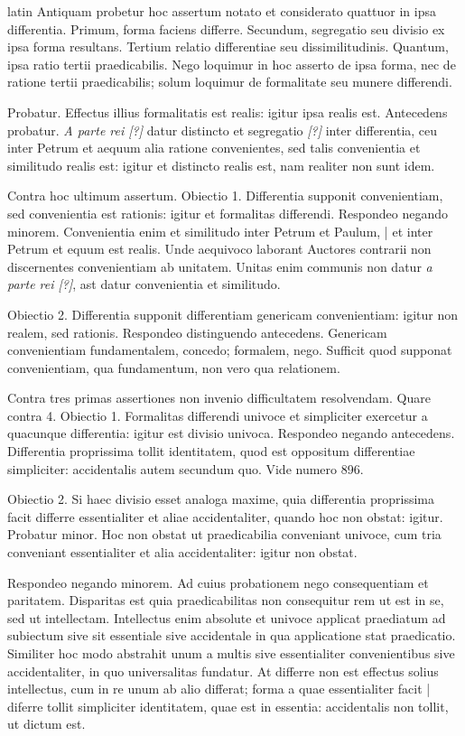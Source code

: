 \begin{otherlanguage*}{latin}
\pstart
Antiquam probetur hoc assertum notato et considerato quattuor in ipsa differentia. Primum, forma faciens differre. Secundum, segregatio seu divisio ex ipsa forma resultans. Tertium relatio differentiae seu dissimilitudinis. Quantum, ipsa ratio tertii praedicabilis. Nego loquimur in hoc asserto de ipsa forma, nec de ratione tertii praedicabilis; solum loquimur de formalitate seu munere differendi. 
\pend

\pstart
Probatur. Effectus illius formalitatis est realis:
igitur ipsa realis est. Antecedens probatur. \emph{A parte rei [?]} datur distincto et segregatio \emph{ [?]} inter differentia, ceu inter Petrum et aequum alia ratione convenientes, sed talis convenientia et similitudo realis est:
igitur et distincto realis est, nam realiter non sunt idem. 
\pend

\pstart
Contra hoc ultimum assertum. Obiectio 1. Differentia supponit convenientiam, sed convenientia est rationis:
igitur et formalitas differendi. Respondeo negando minorem. Convenientia enim et similitudo inter Petrum et Paulum, \textnormal{|} et inter Petrum et equum est realis. Unde aequivoco laborant Auctores contrarii non discernentes convenientiam ab unitatem. Unitas enim communis non datur \emph{a parte rei [?]}, ast datur convenientia et similitudo. 
\pend

\pstart
Obiectio 2. Differentia supponit differentiam genericam convenientiam:
igitur non realem, sed rationis. Respondeo distinguendo antecedens. Genericam convenientiam fundamentalem, concedo; formalem, nego. Sufficit quod supponat convenientiam, qua fundamentum, non vero qua relationem. 
\pend

\pstart
Contra tres primas assertiones non invenio difficultatem resolvendam. Quare contra 4. Obiectio 1. Formalitas differendi univoce et simpliciter exercetur a quacunque differentia:
igitur est divisio univoca. Respondeo negando antecedens. Differentia proprissima tollit identitatem, quod est oppositum differentiae simpliciter:
accidentalis autem secundum quo. Vide numero 896. 
\pend

\pstart
Obiectio 2. Si haec divisio esset analoga maxime, quia differentia proprissima facit differre essentialiter et aliae accidentaliter, quando hoc non obstat:
igitur. Probatur minor. Hoc non obstat ut praedicabilia conveniant univoce, cum tria conveniant essentialiter et alia accidentaliter:
igitur non obstat. 
\pend

\pstart
Respondeo negando minorem. Ad cuius probationem nego consequentiam et paritatem. Disparitas est quia praedicabilitas non consequitur rem ut est in se, sed ut intellectam. Intellectus enim absolute et univoce applicat praediatum ad subiectum sive sit essentiale sive accidentale in qua applicatione stat praedicatio. Similiter hoc modo abstrahit unum a multis sive essentialiter convenientibus sive accidentaliter, in quo universalitas fundatur. At differre non est effectus solius intellectus, cum in re unum ab alio differat; forma a quae essentialiter facit \textnormal{|} diferre tollit simpliciter identitatem, quae est in essentia:
accidentalis non tollit, ut dictum est. 
\pend


\end{otherlanguage*}
